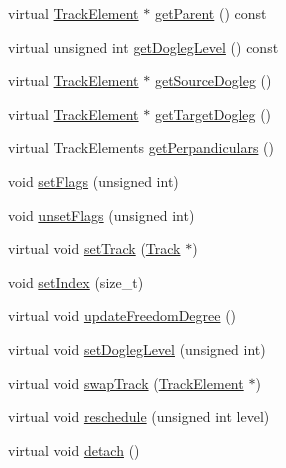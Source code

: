 \begin{DoxyCompactItemize}
\item 
virtual \mbox{\hyperlink{classKite_1_1TrackElement}{Track\+Element}} $\ast$ \mbox{\hyperlink{classKite_1_1TrackElement_a95ec3b8e7e1ec87c20ee0b37bcc96df7}{get\+Parent}} () const
\item 
virtual unsigned int \mbox{\hyperlink{classKite_1_1TrackElement_add78c6f914788c549f144998caacda84}{get\+Dogleg\+Level}} () const
\item 
virtual \mbox{\hyperlink{classKite_1_1TrackElement}{Track\+Element}} $\ast$ \mbox{\hyperlink{classKite_1_1TrackElement_a7e79fbfe77f173d46b1959c41087930a}{get\+Source\+Dogleg}} ()
\item 
virtual \mbox{\hyperlink{classKite_1_1TrackElement}{Track\+Element}} $\ast$ \mbox{\hyperlink{classKite_1_1TrackElement_aeb4e39bd925d093e6c45599433bb421c}{get\+Target\+Dogleg}} ()
\item 
virtual Track\+Elements \mbox{\hyperlink{classKite_1_1TrackElement_aa0ba92ebf19f596537dc051c090d5736}{get\+Perpandiculars}} ()
\item 
void \mbox{\hyperlink{classKite_1_1TrackElement_aeb14f94914af58657a0dc2f50ec98df5}{set\+Flags}} (unsigned int)
\item 
void \mbox{\hyperlink{classKite_1_1TrackElement_a1a6fac115cb81db48e3ac9ffa0721bb5}{unset\+Flags}} (unsigned int)
\item 
virtual void \mbox{\hyperlink{classKite_1_1TrackElement_abd3d8093f871d3d1a7f24b053648026c}{set\+Track}} (\mbox{\hyperlink{classKite_1_1Track}{Track}} $\ast$)
\item 
void \mbox{\hyperlink{classKite_1_1TrackElement_abee236b4d62f51320212f31e010fc1b5}{set\+Index}} (size\+\_\+t)
\item 
virtual void \mbox{\hyperlink{classKite_1_1TrackElement_af5332d647c0482aa90ad7cc9b2a50f3a}{update\+Freedom\+Degree}} ()
\item 
virtual void \mbox{\hyperlink{classKite_1_1TrackElement_a2b90319cb042b283aa5d1fdb1992f11f}{set\+Dogleg\+Level}} (unsigned int)
\item 
virtual void \mbox{\hyperlink{classKite_1_1TrackElement_acc245ce084989d1c34816d0e61b9d510}{swap\+Track}} (\mbox{\hyperlink{classKite_1_1TrackElement}{Track\+Element}} $\ast$)
\item 
virtual void \mbox{\hyperlink{classKite_1_1TrackElement_a0ffe603ec7d46f21f5e56ccbe84c03fb}{reschedule}} (unsigned int level)
\item 
virtual void \mbox{\hyperlink{classKite_1_1TrackElement_ac295bade8aee589f6718dfa79edc2a34}{detach}} ()
\item 

\end{DoxyCompactItemize}
